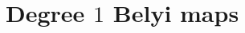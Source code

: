 \documentclass{dcthesis}
\newcommand{\PP}{\mathbb P}
\newcommand{\ZZ}{\mathbb Z}
\newcommand{\defi}[1]{\textsf{#1}}
\newcommand{\wt}[1]{\widetilde{#1}}
\newtheorem{lemma}[prop]{Lemma}
\theoremstyle{definition}
\newtheorem{definition}[prop]{Definition}
\newtheorem{notation}[prop]{Notation}
\theoremstyle{remark}
\numberwithin{equation}{section}
\numberwithin{figure}{section}
\begin{document}
{  \section{Degree $1$ Belyi maps}{\label{sec:degree1}
  }
}
\end{document}
